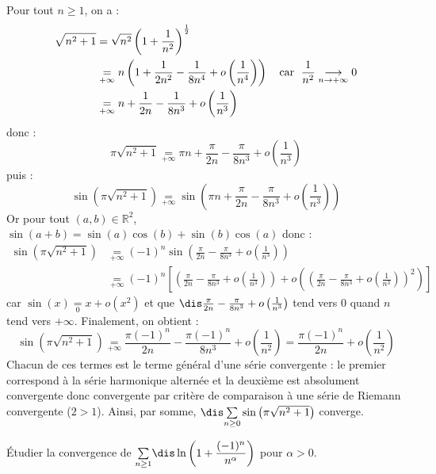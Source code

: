 \documentclass[a4paper,10pt]{report}
\newcommand{\Sum}[2]{\ensuremath{\textstyle{\sum\limits_{#1}^{#2}}}}
\begin{document}
\corr Pour tout $n \geq 1$, on a :
\begin{align*}
\sqrt {n^2 + 1} & = \sqrt{n^2} \left( 1 + \frac{1}{n^2} \right)^{\frac{1}{2}} \\
& \underset{+ \infty}{=} n \left(1 + \frac{1}{2n^2} - \frac{1}{8n^4} + o \left( \frac{1}{n^4} \right) \right) \quad \hbox{car } \; \frac{1}{n^2} \underset{n \rightarrow + \infty}{\longrightarrow} 0\\
& \underset{+ \infty}{=} n + \frac{1}{2n} - \frac{1}{8n^3} +  o \left( \frac{1}{n^3} \right)  
\end{align*}
donc :
$$ \pi \sqrt {n^2 + 1} \underset{+ \infty}{=} \pi n + \frac{\pi}{2n} - \frac{\pi}{8n^3} +  o \left( \frac{1}{n^3} \right)  $$
puis :
$$\sin \left({\pi \sqrt {n^2 + 1}} \right)  \underset{+ \infty}{=} \sin \left(  \pi n + \frac{\pi}{2n} - \frac{\pi}{8n^3} +  o \left( \frac{1}{n^3} \right) \right)$$
Or pour tout $(a,b) \in \mathbb{R}^2$, $\sin(a+b)= \sin(a)\cos(b)+\sin(b) \cos(a)$ donc :
\begin{align*}
 \sin \left({\pi \sqrt {n^2 + 1}} \right)& \underset{+ \infty}{=} (-1)^n \sin \left(\frac{\pi}{2n} - \frac{\pi}{8n^3} +  o \left( \frac{1}{n^3} \right) \right) \\
 & \underset{+ \infty}{=} (-1)^n \left[\left(\frac{\pi}{2n} - \frac{\pi}{8n^3} +  o \left( \frac{1}{n^3} \right) \right) + o \left( \left(\frac{\pi}{2n} - \frac{\pi}{8n^3} +  o \left( \frac{1}{n^3} \right) \right)^2 \right) \right] 
 \end{align*}
car $\sin(x) \underset{0}{=} x + o(x^2)$ et que $\dis \frac{\pi}{2n} - \frac{\pi}{8n^3} +  o \left( \frac{1}{n^3} \right)$ tend vers $0$ quand $n$ tend vers $+ \infty$. Finalement, on obtient :
$$ \sin \left({\pi \sqrt {n^2 + 1}} \right) \underset{+ \infty}{=} \frac{\pi (-1)^n}{2n} - \frac{\pi (-1)^n}{8n^3} +  o \left( \frac{1}{n^2} \right) = \frac{\pi (-1)^n}{2n} +  o \left( \frac{1}{n^2} \right)$$
Chacun de ces termes est le terme général d'une série convergente : le premier correspond à la série harmonique alternée et la deuxième est absolument convergente donc convergente par critère de comparaison à une série de Riemann convergente ($2>1$). Ainsi, par somme, $\dis \Sum{n \geq 0}{} \sin \left({\pi \sqrt {n^2 + 1}} \right)$ converge.

\medskip



\begin{Exercice}{} Étudier la convergence de $\Sum{n \geq 1}{} \dis \ln \left( 1 + \dfrac{(-1)^n}{n^{\alpha}} \right)$ pour $\alpha>0$.
\end{Exercice} 
\end{document}
